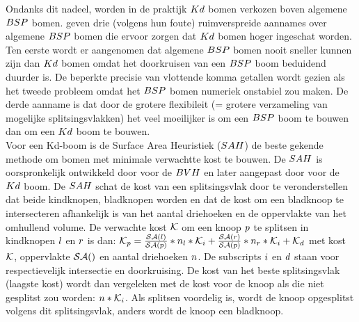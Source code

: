     Ondanks dit nadeel, worden in de praktijk $Kd$ bomen verkozen boven algemene $BSP$ bomen.
    \authorIze{} \cite{ize} geven drie (volgens hun foute) ruimverspreide aannames over algemene $BSP$ bomen die ervoor zorgen dat $Kd$ bomen hoger ingeschat worden.
    Ten eerste wordt er aangenomen dat algemene $BSP$ bomen nooit sneller kunnen zijn dan $Kd$ bomen omdat het doorkruisen van een $BSP$ boom beduidend duurder is.
    De beperkte precisie van vlottende komma getallen wordt gezien als het tweede probleem omdat het $BSP$ bomen numeriek onstabiel zou maken.
    De derde aanname is dat door de grotere flexibileit (= grotere verzameling van mogelijke splitsingsvlakken) het veel moeilijker is om een $BSP$ boom te bouwen dan om een $Kd$ boom te bouwen.
    \\

    Voor een Kd-boom is de Surface Area Heuristiek ($SAH$) de beste gekende methode om bomen met minimale verwachtte kost te bouwen.
    De $SAH$ is oorspronkelijk ontwikkeld door \authorGoldsmithSalmon{} \cite{goldsmith1987automatic} voor de $BVH$ en later aangepast door \authorMacDonaldBooth{} \cite{macdonald1990heuristics} voor de $Kd$ boom. 
    De $SAH$ schat de kost van een splitsingsvlak door te veronderstellen dat beide kindknopen, bladknopen worden en dat de kost om een bladknoop te intersecteren afhankelijk is van het aantal driehoeken en de oppervlakte van het omhullend volume.
    De verwachte kost $\mathcal{K}$ om een knoop $p$ te splitsen in kindknopen ${l}$ en ${r}$ is dan: $\mathcal{K}_p = \frac{\mathcal{SA}(l)}{\mathcal{SA}(p)}*n_l*\mathcal{K}_i + \frac{\mathcal{SA}(r)}{\mathcal{SA}(p)}*n_r*\mathcal{K}_i + \mathcal{K}_d$ met kost $\mathcal{K}$, oppervlakte $\mathcal{SA}()$ en aantal driehoeken $n$.
    De subscripts ${i}$ en ${d}$ staan voor respectievelijk intersectie en doorkruising.
    De kost van het beste splitsingsvlak (laagste kost) wordt dan vergeleken met de kost voor de knoop als die niet gesplitst zou worden: $n*\mathcal{K}_i$.
    Als splitsen voordelig is, wordt de knoop opgesplitst volgens dit splitsingsvlak, anders wordt de knoop een bladknoop.
    \\

